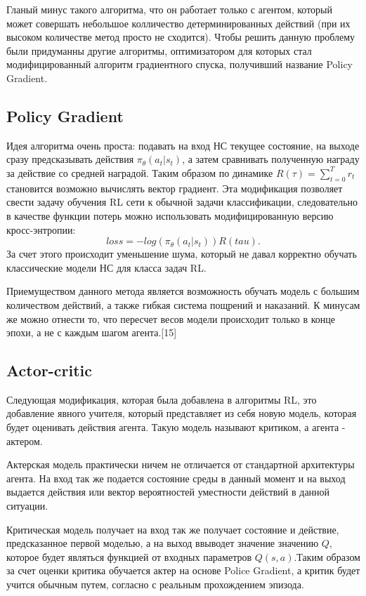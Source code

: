 \documentclass[bachelor, och, coursework]{shiza}
\begin{document}
Гланый минус такого алгоритма, что он работает только с агентом, который может совершать небольшое колличество детерминированных действий (при их высоком количестве метод просто не сходится).
Чтобы решить данную проблему были придуманны другие алгоритмы, оптимизатором для которых стал модифицированный алгоритм градиентного спуска, получивший название Policy Gradient.

\subsection{Policy Gradient}
Идея алгоритма очень проста: подавать на вход НС текущее состояние, на выходе сразу предсказывать действия $\pi_\theta(a_t|s_t)$, а затем сравнивать полученную награду за действие
со средней наградой. Таким образом по динамике $R(\tau) = \sum_{t=0}^T r_t$ становится возможно вычислять вектор градиент. Эта модификация позволяет свести задачу обучения RL сети к
обычной задачи классификации, следовательно в качестве функции потерь можно использовать модифицированную версию кросс-энтропии:
\begin{equation}
    loss = -log(\pi_\theta(a_t|s_t))R(tau).
\end{equation}
За счет этого происходит уменьшение шума, который не давал корректно обучать классические модели НС для класса задач RL.

Приемуществом данного метода является возможность обучать модель с большим количеством действий, а также гибкая система пощрений и наказаний. К минусам же можно отнести
то, что пересчет весов модели происходит только в конце эпохи, а не с каждым шагом агента.[15]
\subsection{Actor-critic}
Следующая модификация, которая была добавлена в алгоритмы RL, это добавление явного учителя, который представляет из себя новую модель, которая будет оценивать действия
агента. Такую модель называют критиком, а агента - актером.

Актерская модель практически ничем не отличается от стандартной архитектуры агента. На вход так же подается состояние среды в данный момент и на выход выдается действия
или вектор вероятностей уместности действий в данной ситуации.

Критическая модель получает на вход так же получает состояние и действие, предсказанное первой моделью, а на выход ввыводет значение значению $Q$, которое будет
являться функцией от входных параметров $Q(s, a)$.Таким образом за счет оценки критика обучается актер на основе Police Gradient, а критик будет учится обычным
путем, согласно с реальным прохождением эпизода.
\end{document}
